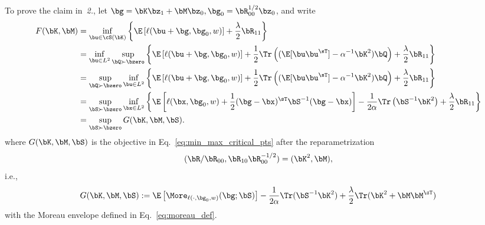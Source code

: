 To prove the claim in~\textit{2.}, 
let $\bg = \bK\bz_1 + \bM \bz_0, \bg_0  = \bR_{00}^{1/2} \bz_0$,
and write
\begin{align}
    F(\bK,\bM)
&=
\inf_{\bu \in \cS(\bK)} 
\left\{
\E\left[\ell(\bu+ \bg,\bg_0,w) 
\right]
+
\frac{\lambda}{2}\bR_{11}
\right\}\\
&=
\inf_{\bu \in L^2} 
\sup_{\bQ\succ \bzero} 
\left\{
\E\left[\ell(\bu+ \bg,\bg_0,w) 
\right]
+
\frac12\Tr\left(
(\E[
\bu\bu^\sT]
- \alpha^{-1} \bK^2
)\bQ\right)+
\frac{\lambda}{2}\bR_{11}
\right\}\\
&= 
\sup_{\bQ\succ \bzero} 
\inf_{\bu \in L^2} 
\left\{
\E\left[\ell(\bu+ \bg,\bg_0,w) 
\right]
+
\frac12\Tr\left(
(\E[
\bu\bu^\sT]
- \alpha^{-1} \bK^2
)\bQ\right)+
\frac{\lambda}{2}\bR_{11}
\right\}\\
&= 
\sup_{\bS\succ \bzero} 
\inf_{\bx \in L^2} 
\left\{
\E\left[\ell(\bx,\bg_0,w) 
+\frac12 (\bg - \bx)^\sT\bS^{-1}(\bg-\bx)
\right]
-\frac1{2\alpha} \Tr\left(\bS^{-1}\bK^2\right) +
\frac{\lambda}{2}\bR_{11}
\right\}\\
&=\sup_{\bS\succ \bzero}  G(\bK,\bM,\bS).
\end{align}
where $G(\bK,\bM, \bS)$ is the objective in Eq.~\eqref{eq:min_max_critical_pts} after the reparametrization 
\begin{equation}
(\bR/\bR_{00},\bR_{10}\bR_{00}^{-1/2}) = (\bK^2,\bM), 
\end{equation}
i.e.,
\begin{equation}
    G(\bK,\bM,\bS) :=
       \E\left[\More_{\ell(\cdot, \bg_0,w)}(\bg;\bS)\right] - \frac1{2\alpha}\Tr(\bS^{-1}\bK^2) 
       + \frac{\lambda}{2}\Tr(\bK^2 + \bM\bM^\sT)
\end{equation}
%
with the Moreau envelope defined in Eq.~\eqref{eq:moreau_def}.
